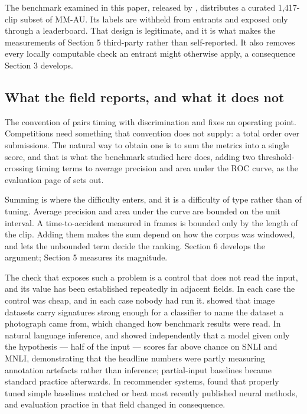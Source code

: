 The benchmark examined in this paper, released by \citet{autopilot2026}, distributes a curated 1,417-clip subset of MM-AU. Its labels are withheld from entrants and exposed only through a leaderboard. That design is legitimate, and it is what makes the measurements of Section 5 third-party rather than self-reported. It also removes every locally computable check an entrant might otherwise apply, a consequence Section 3 develops.

\subsection{What the field reports, and what it does not}
The convention of \citet{karim2022dsta} pairs timing with discrimination and fixes an operating point. Competitions need something that convention does not supply: a total order over submissions. The natural way to obtain one is to sum the metrics into a single score, and that is what the benchmark studied here does, adding two threshold-crossing timing terms to average precision and area under the ROC curve, as the evaluation page of \citet{autopilot2026} sets out.

Summing is where the difficulty enters, and it is a difficulty of type rather than of tuning. Average precision and area under the curve are bounded on the unit interval. A time-to-accident measured in frames is bounded only by the length of the clip. Adding them makes the sum depend on how the corpus was windowed, and lets the unbounded term decide the ranking. Section 6 develops the argument; Section 5 measures its magnitude.

The check that exposes such a problem is a control that does not read the input, and its value has been established repeatedly in adjacent fields. In each case the control was cheap, and in each case nobody had run it. \citet{torralba2011bias} showed that image datasets carry signatures strong enough for a classifier to name the dataset a photograph came from, which changed how benchmark results were read. In natural language inference, \citet{gururangan2018artifacts} and \citet{poliak2018hypothesis} showed independently that a model given only the hypothesis --- half of the input --- scores far above chance on SNLI and MNLI, demonstrating that the headline numbers were partly measuring annotation artefacts rather than inference; partial-input baselines became standard practice afterwards. In recommender systems, \citet{ferraridacrema2019progress} found that properly tuned simple baselines matched or beat most recently published neural methods, and evaluation practice in that field changed in consequence.

